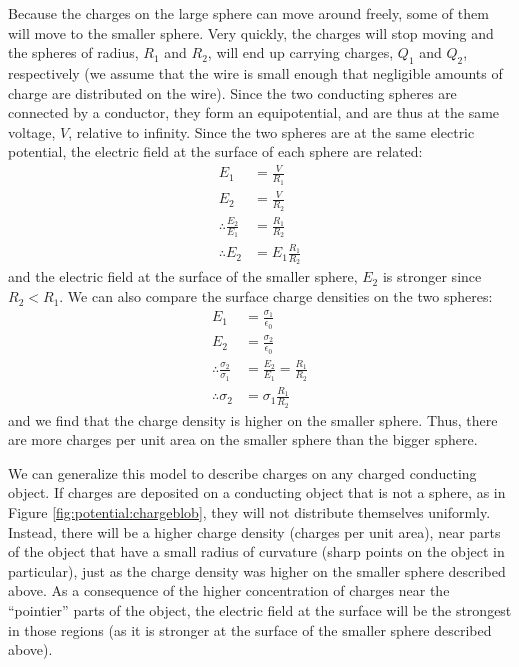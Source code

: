 Because the charges on the large sphere can move around freely, some of them will move to the smaller sphere. Very quickly, the charges will stop moving and the spheres of radius, $R_1$ and $R_2$, will end up carrying charges, $Q_1$ and $Q_2$, respectively (we assume that the wire is small enough that negligible amounts of charge are distributed on the wire). Since the two conducting spheres are connected by a conductor, they form an equipotential, and are thus at the same voltage, $V$, relative to infinity. Since the two spheres are at the same electric potential, the electric field at the surface of each sphere are related:
\begin{align*}
E_1&=\frac{V}{R_1}\\
E_2&=\frac{V}{R_2}\\
\therefore \frac{E_2}{E_1}&=\frac{R_1}{R_2}\\
\therefore E_2&=E_1\frac{R_1}{R_2}
\end{align*}
and the electric field at the surface of the smaller sphere, $E_2$ is stronger since $R_2<R_1$. We can also compare the surface charge densities on the two spheres:
\begin{align*}
E_1&=\frac{\sigma_1}{\epsilon_0}\\
E_2&=\frac{\sigma_2}{\epsilon_0}\\
\therefore \frac{\sigma_2}{\sigma_1}&=\frac{E_2}{E_1}=\frac{R_1}{R_2}\\
\therefore \sigma_2&=\sigma_1 \frac{R_1}{R_2}
\end{align*}
and we find that the charge density is higher on the smaller sphere. Thus, there are more charges per unit area on the smaller sphere than the bigger sphere.

We can generalize this model to describe charges on any charged conducting object. If charges are deposited on a conducting object that is not a sphere, as in Figure \ref{fig:potential:chargeblob}, they will not distribute themselves uniformly. Instead, there will be a higher charge density (charges per unit area), near parts of the object that have a small radius of curvature (sharp points on the object in particular), just as the charge density was higher on the smaller sphere described above. As a consequence of the higher concentration of charges near the ``pointier'' parts of the object, the electric field at the surface will be the strongest in those regions (as it is stronger at the surface of the smaller sphere described above).

